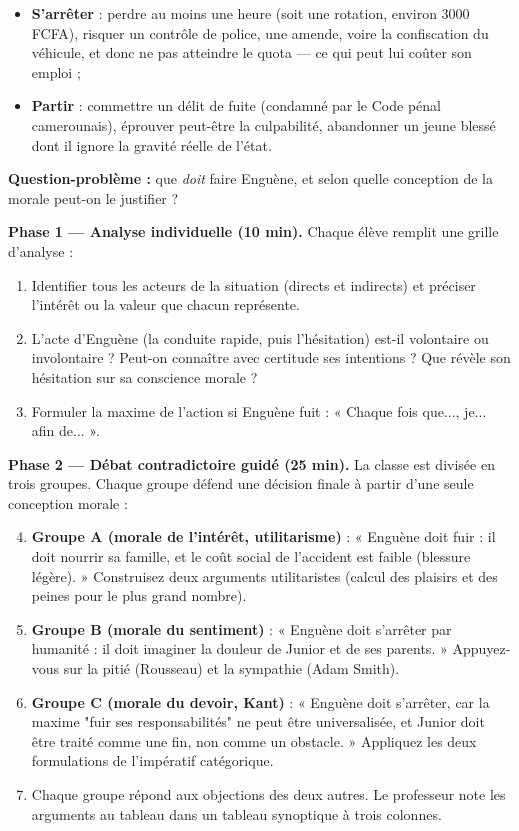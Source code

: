\documentclass[11pt]{article}
\newcommand{\cle}[1]{{\popxbold\color{popdark}#1}}
\newcounter{popsec}
\newcounter{popsub}
\newcommand{\courssub}[1]{%
  \stepcounter{popsub}%
  \par\vspace{9pt}\noindent{\popxbold\fontsize{11.5}{13}\selectfont\color{popink}{\color{poporange}\thepopsec.\thepopsub}\hspace{6pt}#1}\par\nopagebreak\vspace{4pt}
}
\begin{document}
\begin{itemize}
\item \textbf{S'arrêter} : perdre au moins une heure (soit une rotation, environ \num{3000} FCFA), risquer un contrôle de police, une amende, voire la confiscation du véhicule, et donc ne pas atteindre le quota — ce qui peut lui coûter son emploi ;
\item \textbf{Partir} : commettre un délit de fuite (condamné par le Code pénal camerounais), éprouver peut-être la \cle{culpabilité}, abandonner un jeune blessé dont il ignore la gravité réelle de l'état.
\end{itemize}

\textbf{Question-problème :} que \emph{doit} faire Enguène, et selon quelle conception de la morale peut-on le justifier ?

\courssub{Consignes}

\textbf{Phase 1 — Analyse individuelle (10 min).} Chaque élève remplit une grille d'analyse :

\begin{enumerate}
\item Identifier tous les acteurs de la situation (directs et indirects) et préciser l'intérêt ou la valeur que chacun représente.
\item L'acte d'Enguène (la conduite rapide, puis l'hésitation) est-il volontaire ou involontaire ? Peut-on connaître avec certitude ses intentions ? Que révèle son hésitation sur sa conscience morale ?
\item Formuler la \cle{maxime} de l'action si Enguène fuit : « Chaque fois que..., je... afin de... ».
\end{enumerate}

\textbf{Phase 2 — Débat contradictoire guidé (25 min).} La classe est divisée en trois groupes. Chaque groupe défend une décision finale à partir d'une seule conception morale :

\begin{enumerate}
\setcounter{enumi}{3}
\item \textbf{Groupe A (morale de l'intérêt, utilitarisme)} : « Enguène doit fuir : il doit nourrir sa famille, et le coût social de l'accident est faible (blessure légère). » Construisez deux arguments utilitaristes (calcul des plaisirs et des peines pour le plus grand nombre).
\item \textbf{Groupe B (morale du sentiment)} : « Enguène doit s'arrêter par humanité : il doit imaginer la douleur de Junior et de ses parents. » Appuyez-vous sur la pitié (Rousseau) et la sympathie (Adam Smith).
\item \textbf{Groupe C (morale du devoir, Kant)} : « Enguène doit s'arrêter, car la maxime "fuir ses responsabilités" ne peut être universalisée, et Junior doit être traité comme une fin, non comme un obstacle. » Appliquez les deux formulations de l'impératif catégorique.
\item Chaque groupe répond aux objections des deux autres. Le professeur note les arguments au tableau dans un tableau synoptique à trois colonnes.
\end{enumerate}
\end{document}
